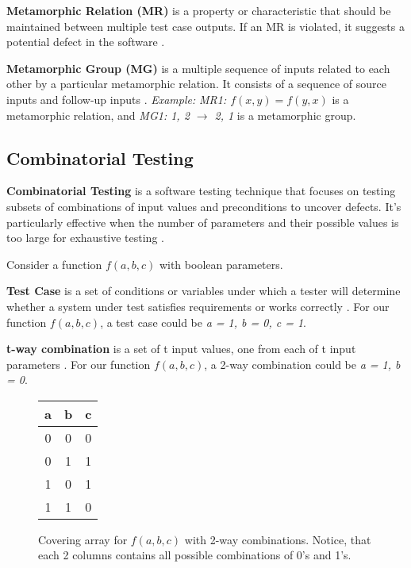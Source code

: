\textbf{Metamorphic Relation (MR)} is a property or characteristic that should be maintained between multiple test case outputs.
If an MR is violated, it suggests a potential defect in the software \cite{MetamorphicTestingReview}.

\textbf{Metamorphic Group (MG)} is a multiple sequence of inputs related to each other by a particular metamorphic relation.
It consists of a sequence of source inputs and follow-up inputs \cite{MetamorphicTestingReview}. \textit{Example:} \textit{MR1: $f(x, y) = f(y, x)$} is a metamorphic relation, and \textit{MG1: {1, 2} $\rightarrow$ {2, 1}} is a metamorphic group.

\subsection{Combinatorial Testing}\label{subsec:combinatorial-testing}

\textbf{Combinatorial Testing} is a software testing technique that focuses on testing subsets of combinations of input values and preconditions to uncover defects.
It's particularly effective when the number of parameters and their possible values is too large for exhaustive testing \cite{FELDERER20161}.

Consider a function $f(a, b, c)$ with boolean parameters.

\textbf{Test Case} is a set of conditions or variables under which a tester will determine whether a system under test satisfies requirements or works correctly \cite{comer}.
For our function $f(a, b, c)$, a test case could be \textit{a = 1, b = 0, c = 1}.

\textbf{t-way combination} is a set of t input values, one from each of t input parameters \cite{comer}.
For our function $f(a, b, c)$, a 2-way combination could be \textit{a = 1, b = 0}.

\begin{figure}
    \centering
    \begin{tabular}{|c|c|c|}
        \hline
        a & b & c \\
        \hline
        0 & 0 & 0 \\
        0 & 1 & 1 \\
        1 & 0 & 1 \\
        1 & 1 & 0 \\
        \hline
    \end{tabular}
    \caption{Covering array for $f(a, b, c)$ with 2-way combinations. Notice, that each 2 columns contains all possible combinations of 0's and 1's.}
    \label{fig:CovArray}
\end{figure}

